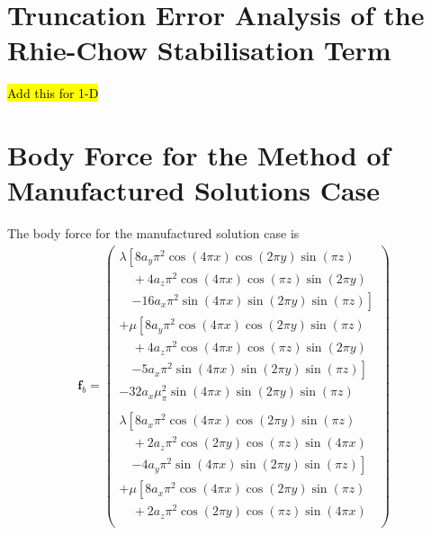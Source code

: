 \documentclass[sn-mathphys,Numbered]{sn-jnl}%
\newcommand{\bb}{\boldsymbol}
\begin{document}
\begin{appendices}

\section{Truncation Error Analysis of the Rhie-Chow Stabilisation Term}
\label{app:RhieChow}

\hl{Add this for 1-D}


\section{Body Force for the Method of Manufactured Solutions Case} \label{app:mms}
The body force for the manufactured solution case is
\begin{align}
\bb{f}_b = 
    \begin{pmatrix}
    \lambda
    \left[
        8 a_y \pi^2 \cos(4\pi x) \cos(2\pi y) \sin(\pi z) \right. \\
        \quad + 4 a_z \pi^2 \cos(4\pi x) \cos(\pi z) \sin(2\pi y) \\
        \quad \left. - 16 a_x \pi^2 \sin(4\pi x) \sin(2\pi y) \sin(\pi z)
    \right] \\
    + \mu
    \left[
        8 a_y \pi^2 \cos(4\pi x) \cos(2\pi y) \sin(\pi z) \right. \\
        \quad + 4 a_z \pi^2 \cos(4\pi x) \cos(\pi z) \sin(2\pi y) \\
        \quad \left. - 5 a_x \pi^2 \sin(4\pi x) \sin(2\pi y) \sin(\pi z)
    \right] \\
    - 32 a_x \mu_ \pi^2 \sin(4\pi x) \sin(2\pi y) \sin(\pi z) \\
    \\
    \lambda
    \left[
        8 a_x \pi^2 \cos(4\pi x) \cos(2\pi y) \sin(\pi z) \right. \\
        \quad + 2 a_z \pi^2 \cos(2\pi y) \cos(\pi z) \sin(4\pi x) \\
        \quad \left. - 4 a_y \pi^2 \sin(4\pi x) \sin(2\pi y) \sin(\pi z)
    \right] \\
    + \mu
    \left[
        8 a_x \pi^2 \cos(4\pi x) \cos(2\pi y) \sin(\pi z) \right. \\
        \quad + 2 a_z \pi^2 \cos(2\pi y) \cos(\pi z) \sin(4\pi x) \\

\end{pmatrix}
\end{align}
\end{appendices}
\end{document}
